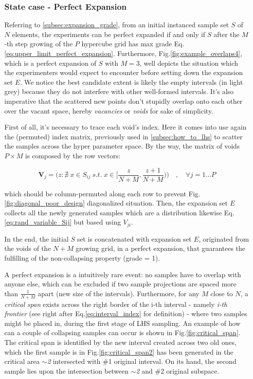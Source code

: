 \documentclass[12pt]{article}
\newcommand{\meqref}[1]{Eq.\ref{#1}}
\newcommand{\mfigref}[1]{Fig.\ref{#1}}
\begin{document}
\subsubsection{State case - Perfect Expansion}
\label{subsubsec:perfect_expansion_case}
Referring to \cref{subsec:expansion_grade}, from an initial instanced sample set $S$ of $N$ elements, the experiments can be perfect expanded if and only if $S$ after the $M$-th step growing of the $P$ hypercube grid has max grade \meqref{eq:upper_limit_perfect_expansion}. Furthermore, \mfigref{fig:example_overlaps4}, which is a perfect expansion of $S$ with $M = 3$, well depicts the situation which the experimenters would expect to encounter before setting down the expansion set $E$. We notice the best candidate extent is likely the empty intervals (in light grey) because they do not interfere with other well-formed intervals. It's also imperative that the scattered new points don't stupidly overlap onto each other over the vacant space, hereby \textit{vacancies} or \textit{voids} for sake of simplicity.

First of all, it's necessary to trace each void's index. Here it comes into use again the (permuted) index matrix, previously used in \cref{subsec:how_to_lhs} to scatter the samples across the hyper parameter space. By the way, the matrix of voids $P \times M$ is composed by the row vectors: 

\begin{equation}
\label{eq:voids_matrix}
\textbf{V}_j = \bigg( z : \nexists\; x \in S_{ij} \; s.t. \; x \in \Big[\frac{z}{N+M}, \frac{z+1}{N+M}\Big) \bigg) \quad, \quad \forall j = 1...P
\end{equation}

which should be column-permuted along each row to prevent \mfigref{fig:diagonal_poor_design} diagonalized situation.
Then, the expansion set $E$ collects all the newly generated samples which are a distribution likewise \meqref{eq:rand_variable_Sij} but based using $V_{ji}$. 

In the end, the initial $S$ set is concatenated with expansion set $E$, originated from the voids of the $N+M$ growing grid, in a perfect expansion, that guarantees the fulfilling of the non-collapsing property (grade = 1). 

A perfect expansion is a intuitively rare event: no samples have to overlap with anyone else, which can be excluded if two sample projections are spaced more than $\frac{1}{N+M}$ apart (new size of the intervals). Furthermore, for any $M$ close to $N$, a \textit{critical span} exists across the right border of the i-th interval - namely \textit{i-th frontier} (see right after \meqref{eq:interval_index} for definition) - where two samples might be placed in, during the first stage of LHS sampling. An example of how can a couple of collapsing samples can occur is shown in \mfigref{fig:critical_span}. The critical span is identified by the new interval created across two old ones, which the first sample is in \mfigref{fig:critical_span2} has been generated in the critical area \textit{$\sim$2} intersected with \#1 original interval. On its hand, the second sample lies upon the intersection between \textit{$\sim$2} and \#2 original subspace.
\end{document}

